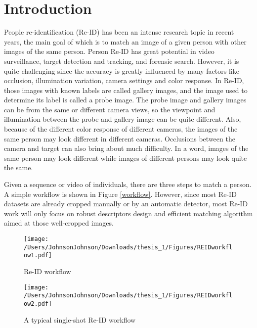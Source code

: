 \chapter{Introduction}

People re-identification (Re-ID) has been an intense research topic in recent years, the main goal of which is to match an image of a given person with other images of the same person. Person Re-ID has great potential in video surveillance, target detection and tracking, and forensic search. However, it is quite challenging since the accuracy is greatly influenced by many factors like occlusion, illumination variation, camera settings and color response. In Re-ID, those images with known labels are called gallery images, and the image used to determine its label is called a probe image. The probe image and gallery images can be from the same or different camera views, so the viewpoint and illumination between the probe and gallery image can be quite different. Also, because of the different color response of different cameras, the images of the same person may look different in different cameras. Occlusions between the camera and target can also bring about much difficulty.  In a word, images of the same person may look different while images of different persons may look quite the same. 

Given a sequence or video of individuals, there are three steps to match a person. A simple workflow is shown in Figure \ref{workflow}. However, since most Re-ID datasets are already cropped manually or by an automatic detector, most Re-ID work will only focus on robust descriptors design and efficient matching algorithm aimed at those well-cropped images. 


\begin{figure}[H]
\centering
\texttt{[image: /Users/JohnsonJohnson/Downloads/thesis\_1/Figures/REIDworkflow1.pdf]}
\vspace{1em}
\caption{Re-ID workflow}
\end{figure}
\label{workflow}

\begin{figure}[H]
\centering
\texttt{[image: /Users/JohnsonJohnson/Downloads/thesis\_1/Figures/REIDworkflow2.pdf]}
\vspace{1em}
\caption{A typical single-shot Re-ID workflow}
\end{figure}




